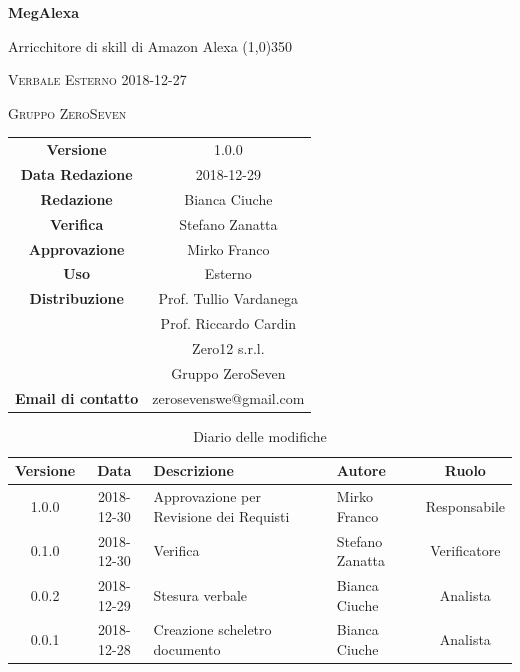 \documentclass[a4paper,12pt]{article}
\author{Bianca Ciuche}
\date{2018-12-27}
\begin{document}
\begin{titlepage}
	\centering
	{\huge\bfseries MegAlexa\par}
	Arricchitore di skill di Amazon Alexa
	\line(1,0){350} \\
	{\scshape\LARGE Verbale Esterno 2018-12-27 \par}
	\vspace{1cm}
	{\scshape Gruppo ZeroSeven \par}
	\logo
	\begin{tabular}{c|c}
		{\hfill \textbf{Versione}} 			& 1.0.0				\\
		{\hfill\textbf{Data Redazione}} 	& 2018-12-29		\\ 
		{\hfill\textbf{Redazione}} 			&  		Bianca Ciuche	\\ 
		{\hfill\textbf{Verifica}} 				&  	Stefano Zanatta			\\ 
		{\hfill\textbf{Approvazione}} 		&  		Mirko Franco	\\ 
		{\hfill\textbf{Uso}} 					& 	Esterno	\\ 
		{\hfill\textbf{Distribuzione}} 			& 			Prof. Tullio Vardanega \\ & Prof. Riccardo Cardin \\ & Zero12 s.r.l.	\\ & Gruppo ZeroSeven \\
		{\hfill\textbf{Email di contatto}} & zerosevenswe@gmail.com \\
	\end{tabular}
\end{titlepage}
	
		\label{LastFrontPage}
	
	
	\newpage
	\cleardoublepage
	\begin{table}[tbph]
		\centering
		\begin{tabularx}{\textwidth}{|c|c|X|X|c|}
			\hline
			\textbf{Versione} & \textbf{Data} & \textbf{Descrizione} & \textbf{Autore} & \textbf{Ruolo} \\
			\hline
			1.0.0 & 2018-12-30 & Approvazione per Revisione dei Requisti & Mirko Franco & Responsabile \\
			\hline
			0.1.0 & 2018-12-30 & Verifica & Stefano Zanatta &Verificatore \\
			\hline
			0.0.2 & 2018-12-29 & Stesura verbale & Bianca Ciuche &Analista \\
			\hline
			0.0.1 & 2018-12-28 & Creazione scheletro documento
			& Bianca Ciuche & Analista\\
			\hline
		\end{tabularx}
		\caption{Diario delle modifiche}
	\end{table}
	
\end{document}
